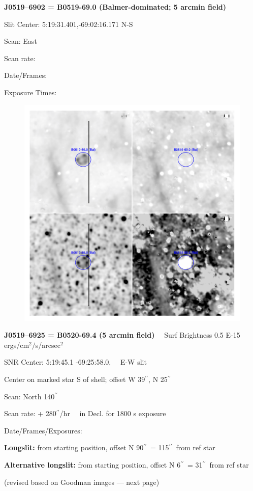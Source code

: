 \documentclass[11pt]{article}
\newcommand{\arcsec}{$^{\prime\prime}$}
\begin{document}
\newpage
{\bf J0519--6902 = B0519-69.0 (Balmer-dominated; 5 arcmin field)}  
 
Slit Center:   5:19:31.401,-69:02:16.171 N-S

Scan:  East

Scan rate:  

Date/Frames:

Exposure Times:  

\begin{figure}
\includegraphics[width=11.cm]{snapshots/B0519-690_5arcmin.png}
\end{figure}

\newpage
{\bf J0519--6925 = B0520-69.4 (5 arcmin field)}  \ \ Surf Brightness 0.5 E-15 ergs/cm$^2/$s/arcsec$^2$
 
SNR Center:   5:19:45.1  -69:25:58.0, \ \  E-W slit 

Center on marked star S of shell; offset W 39\arcsec, N 25\arcsec

Scan:  North 140\arcsec

Scan rate:  + 280\arcsec/hr \ \ in Decl.  for 1800 s exposure

Date/Frames/Exposures:

\vspace{0.20in}
{\bf Longslit:}  from starting position, offset N 90\arcsec\ = 115\arcsec\ from ref star

{\bf Alternative longslit:}  from starting position, offset N 6\arcsec\ = 31\arcsec\ from ref star


(revised based on Goodman images --- next page)
\end{document}
